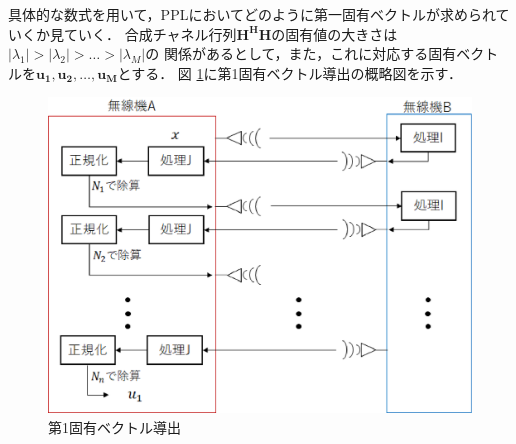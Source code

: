 具体的な数式を用いて，PPLにおいてどのように第一固有ベクトルが求められていくか見ていく．
合成チャネル行列$\bm{H^HH}$の固有値の大きさは$|\lambda_1|>|\lambda_2|>\ldots>|\lambda_M|$の
関係があるとして，また，これに対応する固有ベクトルを$\bm{u_1},\bm{u_2},\ldots,\bm{u_M}$とする．
図 \ref{figProcIJ1}に第1固有ベクトル導出の概略図を示す．
\begin{figure}
    \centering
    \includegraphics[width=0.7\linewidth]{chapter3/figure/ProcIJ1.eps}
    \caption{第1固有ベクトル導出}
    \label{figProcIJ1}
\end{figure}

